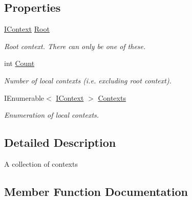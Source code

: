 \subsection*{Properties}
\begin{DoxyCompactItemize}
\item 
\mbox{\hyperlink{interfacecp_games_1_1core_1_1_rapid_m_v_c_1_1_i_context}{I\+Context}} \mbox{\hyperlink{interfacecp_games_1_1core_1_1_rapid_m_v_c_1_1_i_context_collection_a995731ffa92565a90f8b176596a5658a}{Root}}
\begin{DoxyCompactList}\small\item\em Root context. There can only be one of these. \end{DoxyCompactList}\item 
int \mbox{\hyperlink{interfacecp_games_1_1core_1_1_rapid_m_v_c_1_1_i_context_collection_a3567007696dbd07fa6bd839d4c82fb6b}{Count}}
\begin{DoxyCompactList}\small\item\em Number of local contexts (i.\+e. excluding root context). \end{DoxyCompactList}\item 
I\+Enumerable$<$ \mbox{\hyperlink{interfacecp_games_1_1core_1_1_rapid_m_v_c_1_1_i_context}{I\+Context}} $>$ \mbox{\hyperlink{interfacecp_games_1_1core_1_1_rapid_m_v_c_1_1_i_context_collection_abac0a1b73a4c00c78860d5b246ba50be}{Contexts}}
\begin{DoxyCompactList}\small\item\em Enumeration of local contexts. \end{DoxyCompactList}\end{DoxyCompactItemize}


\subsection{Detailed Description}
A collection of contexts 



\subsection{Member Function Documentation}
\mbox{\label{interfacecp_games_1_1core_1_1_rapid_m_v_c_1_1_i_context_collection_a1064f8516b93d0a9def640401ab0da26}} 
